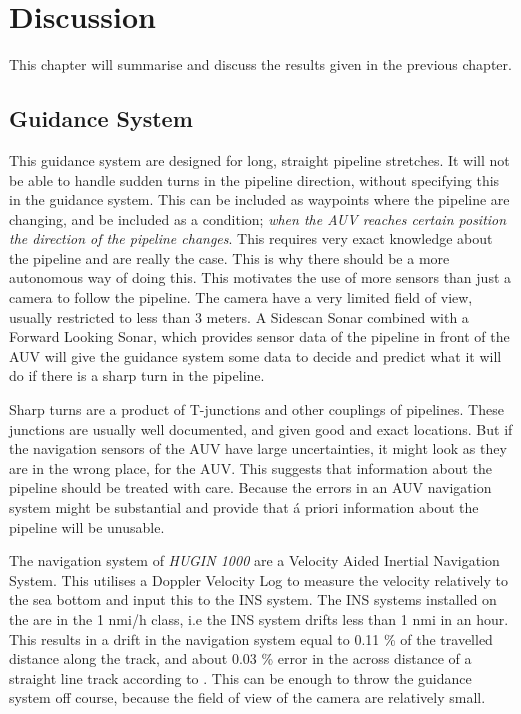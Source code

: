 \chapter{Discussion}
	This chapter will summarise and discuss the results given in the previous chapter.

\section{Guidance System}
	This guidance system are designed for long, straight pipeline stretches. It will not be able to handle
	sudden turns in the pipeline direction, without specifying this in the guidance system. This can be
	included as waypoints where the pipeline are changing, and be included as a condition; \textit{when the AUV
	reaches certain position the direction of the pipeline changes}. This requires very exact knowledge
	about the pipeline and are really the case. This is why there should be a more autonomous way of
	doing this. This motivates the use of more sensors than just a camera to follow the pipeline. The
	camera have a very limited field of view, usually restricted to less than 3 meters. A Sidescan Sonar
	combined with a Forward Looking Sonar, which provides sensor data of the pipeline in front of the AUV
	will give the guidance system some data to decide and predict what it will do if there is a sharp
	turn in the pipeline.

	Sharp turns are a product of T-junctions and other couplings of pipelines. These
	junctions are usually well documented, and given good and exact locations. But if the navigation
	sensors of the AUV have large uncertainties, it might look as they are in the wrong
	place, for the AUV. This suggests that information about the pipeline should be treated with care. Because the
	errors in an AUV navigation system might be substantial and provide that \'a priori information about
	the pipeline will be unusable. 

	The navigation system of \textit{HUGIN 1000} are a Velocity Aided Inertial Navigation System. This
	utilises a Doppler Velocity Log to measure the velocity relatively to the sea bottom and input this to
	the INS system. The INS systems installed on the \hugin are in the 1 nmi/h class, i.e the INS system drifts
 	less than 1 nmi in an hour. This results in a drift in the navigation system equal to
	0.11 \% of the travelled distance along the track, and about 0.03 \% error in the across distance of a
	straight line track according to \cite{INS_Hugin}. This can be enough to throw the guidance system off
	course, because the field of view of the camera are relatively small.

